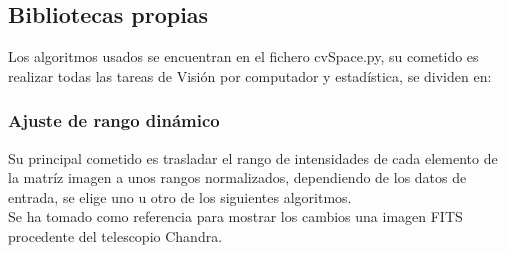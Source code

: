 	\subsection{Bibliotecas propias}
	Los algoritmos usados se encuentran en el fichero cvSpace.py, su cometido es realizar todas las tareas de Visión por computador y estadística, se dividen en:
	\subsubsection{Ajuste de rango dinámico}
	Su principal cometido es trasladar el rango de intensidades de cada elemento de la matríz imagen a unos rangos normalizados, dependiendo de los datos de entrada, se elige uno u otro de los siguientes algoritmos.\\
	Se ha tomado como referencia para mostrar los cambios una imagen FITS procedente del telescopio Chandra.
